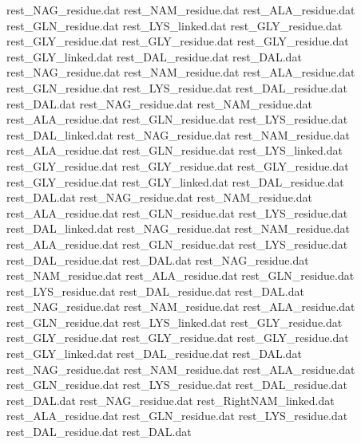 rest_NAG_residue.dat            
rest_NAM_residue.dat            
rest_ALA_residue.dat            
rest_GLN_residue.dat            
rest_LYS_linked.dat             
rest_GLY_residue.dat
rest_GLY_residue.dat
rest_GLY_residue.dat
rest_GLY_residue.dat
rest_GLY_linked.dat
rest_DAL_residue.dat            
rest_DAL.dat                    
rest_NAG_residue.dat            
rest_NAM_residue.dat            
rest_ALA_residue.dat            
rest_GLN_residue.dat            
rest_LYS_residue.dat            
rest_DAL_residue.dat            
rest_DAL.dat                    
rest_NAG_residue.dat            
rest_NAM_residue.dat            
rest_ALA_residue.dat            
rest_GLN_residue.dat            
rest_LYS_residue.dat            
rest_DAL_linked.dat             
rest_NAG_residue.dat            
rest_NAM_residue.dat            
rest_ALA_residue.dat            
rest_GLN_residue.dat            
rest_LYS_linked.dat             
rest_GLY_residue.dat
rest_GLY_residue.dat
rest_GLY_residue.dat
rest_GLY_residue.dat
rest_GLY_linked.dat
rest_DAL_residue.dat            
rest_DAL.dat                    
rest_NAG_residue.dat            
rest_NAM_residue.dat            
rest_ALA_residue.dat            
rest_GLN_residue.dat            
rest_LYS_residue.dat            
rest_DAL_linked.dat             
rest_NAG_residue.dat            
rest_NAM_residue.dat            
rest_ALA_residue.dat            
rest_GLN_residue.dat            
rest_LYS_residue.dat            
rest_DAL_residue.dat            
rest_DAL.dat                    
rest_NAG_residue.dat            
rest_NAM_residue.dat            
rest_ALA_residue.dat            
rest_GLN_residue.dat            
rest_LYS_residue.dat            
rest_DAL_residue.dat            
rest_DAL.dat                    
rest_NAG_residue.dat            
rest_NAM_residue.dat            
rest_ALA_residue.dat            
rest_GLN_residue.dat            
rest_LYS_linked.dat             
rest_GLY_residue.dat
rest_GLY_residue.dat
rest_GLY_residue.dat
rest_GLY_residue.dat
rest_GLY_linked.dat
rest_DAL_residue.dat            
rest_DAL.dat                    
rest_NAG_residue.dat            
rest_NAM_residue.dat            
rest_ALA_residue.dat            
rest_GLN_residue.dat            
rest_LYS_residue.dat            
rest_DAL_residue.dat            
rest_DAL.dat                    
rest_NAG_residue.dat            
rest_RightNAM_linked.dat        
rest_ALA_residue.dat            
rest_GLN_residue.dat            
rest_LYS_residue.dat            
rest_DAL_residue.dat            
rest_DAL.dat                    
